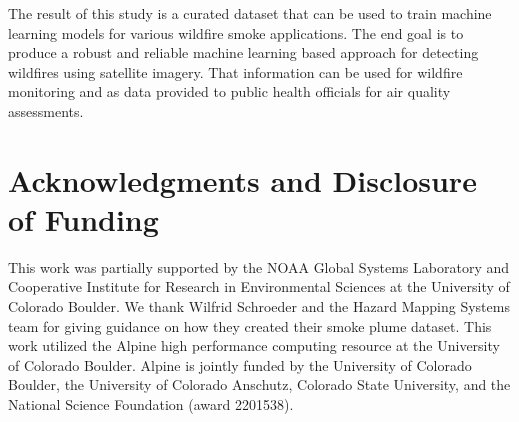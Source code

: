 \documentclass{article}
\begin{document}
The result of this study is a curated dataset that can be used to train machine learning models for various wildfire smoke applications. The end goal is to produce a robust and reliable machine learning based approach for detecting wildfires using satellite imagery. That information can be used for wildfire monitoring and as data provided to public health officials for air quality assessments.


\section{Acknowledgments and Disclosure of Funding}
This work was partially supported by the NOAA Global Systems Laboratory and Cooperative Institute for Research in Environmental Sciences at the University of Colorado Boulder. We thank Wilfrid Schroeder and the Hazard Mapping Systems team for giving guidance on how they created their smoke plume dataset. This work utilized the Alpine high performance computing resource at the University of Colorado Boulder. Alpine is jointly funded by the University of Colorado Boulder, the University of Colorado Anschutz, Colorado State University, and the National Science Foundation (award 2201538). 


\end{document}
